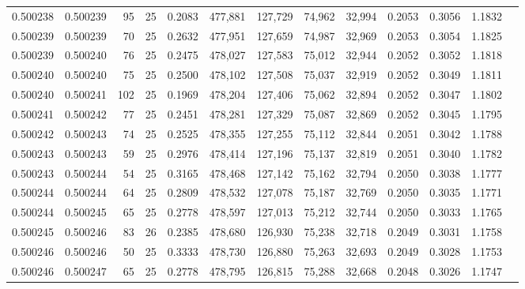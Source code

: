 \begin{tabular}{rrrrrrrrrrrrr}
0.500238 & 0.500239 &  95 &  25 &                                     0.2083 & 477,881 & 127,729 &  74,962 &  32,994 & 0.2053 & 0.3056 & 1.1832 \\
0.500239 & 0.500239 &  70 &  25 &                                     0.2632 & 477,951 & 127,659 &  74,987 &  32,969 & 0.2053 & 0.3054 & 1.1825 \\
0.500239 & 0.500240 &  76 &  25 &                                     0.2475 & 478,027 & 127,583 &  75,012 &  32,944 & 0.2052 & 0.3052 & 1.1818 \\
0.500240 & 0.500240 &  75 &  25 &                                     0.2500 & 478,102 & 127,508 &  75,037 &  32,919 & 0.2052 & 0.3049 & 1.1811 \\
0.500240 & 0.500241 & 102 &  25 &                                     0.1969 & 478,204 & 127,406 &  75,062 &  32,894 & 0.2052 & 0.3047 & 1.1802 \\
0.500241 & 0.500242 &  77 &  25 &                                     0.2451 & 478,281 & 127,329 &  75,087 &  32,869 & 0.2052 & 0.3045 & 1.1795 \\
0.500242 & 0.500243 &  74 &  25 &                                     0.2525 & 478,355 & 127,255 &  75,112 &  32,844 & 0.2051 & 0.3042 & 1.1788 \\
0.500243 & 0.500243 &  59 &  25 &                                     0.2976 & 478,414 & 127,196 &  75,137 &  32,819 & 0.2051 & 0.3040 & 1.1782 \\
0.500243 & 0.500244 &  54 &  25 &                                     0.3165 & 478,468 & 127,142 &  75,162 &  32,794 & 0.2050 & 0.3038 & 1.1777 \\
0.500244 & 0.500244 &  64 &  25 &                                     0.2809 & 478,532 & 127,078 &  75,187 &  32,769 & 0.2050 & 0.3035 & 1.1771 \\
0.500244 & 0.500245 &  65 &  25 &                                     0.2778 & 478,597 & 127,013 &  75,212 &  32,744 & 0.2050 & 0.3033 & 1.1765 \\
0.500245 & 0.500246 &  83 &  26 &                                     0.2385 & 478,680 & 126,930 &  75,238 &  32,718 & 0.2049 & 0.3031 & 1.1758 \\
0.500246 & 0.500246 &  50 &  25 &                                     0.3333 & 478,730 & 126,880 &  75,263 &  32,693 & 0.2049 & 0.3028 & 1.1753 \\
0.500246 & 0.500247 &  65 &  25 &                                     0.2778 & 478,795 & 126,815 &  75,288 &  32,668 & 0.2048 & 0.3026 & 1.1747 \\

\end{tabular}
